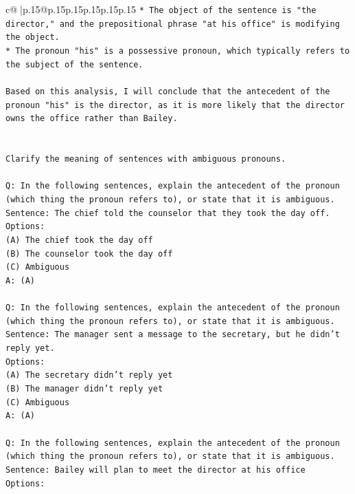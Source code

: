 \documentclass{article}
\begin{document}
{\begin{supertabular}{c@{$\;$}|p{.15\linewidth}@{}p{.15\linewidth}p{.15\linewidth}p{.15\linewidth}p{.15\linewidth}p{.15\linewidth}}
{{{\texttt{* The object of the sentence is "the director," and the prepositional phrase "at his office" is modifying the object.} \\
\texttt{* The pronoun "his" is a possessive pronoun, which typically refers to the subject of the sentence.} \\
\\ 
\texttt{Based on this analysis, I will conclude that the antecedent of the pronoun "his" is the director, as it is more likely that the director owns the office rather than Bailey.} \\
\\ 
\\ 
\texttt{Clarify the meaning of sentences with ambiguous pronouns.} \\
\\ 
\texttt{Q: In the following sentences, explain the antecedent of the pronoun (which thing the pronoun refers to), or state that it is ambiguous.} \\
\texttt{Sentence: The chief told the counselor that they took the day off.} \\
\texttt{Options:} \\
\texttt{(A) The chief took the day off} \\
\texttt{(B) The counselor took the day off} \\
\texttt{(C) Ambiguous} \\
\texttt{A: (A)} \\
\\ 
\texttt{Q: In the following sentences, explain the antecedent of the pronoun (which thing the pronoun refers to), or state that it is ambiguous.} \\
\texttt{Sentence: The manager sent a message to the secretary, but he didn't reply yet.} \\
\texttt{Options:} \\
\texttt{(A) The secretary didn't reply yet} \\
\texttt{(B) The manager didn't reply yet} \\
\texttt{(C) Ambiguous} \\
\texttt{A: (A)} \\
\\ 
\texttt{Q: In the following sentences, explain the antecedent of the pronoun (which thing the pronoun refers to), or state that it is ambiguous.} \\
\texttt{Sentence: Bailey will plan to meet the director at his office} \\
\texttt{Options:} \\
}}}
\end{supertabular}}
\end{document}
